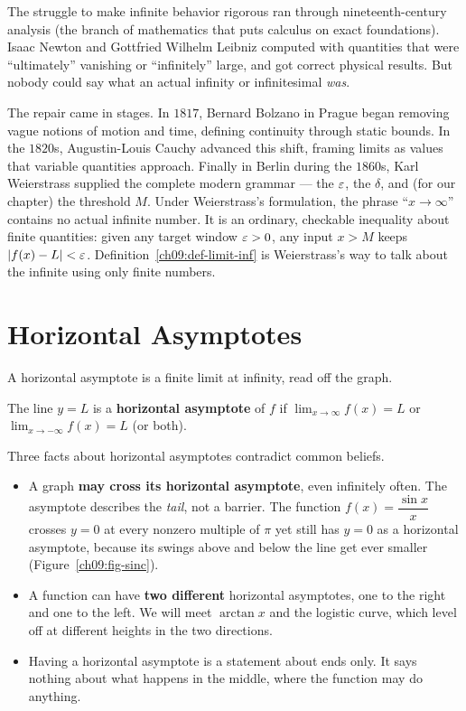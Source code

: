 \begin{historybox}
The struggle to make infinite behavior rigorous ran through
nineteenth-century analysis (the branch of mathematics that puts calculus on
exact foundations). Isaac Newton and Gottfried Wilhelm Leibniz computed
with quantities that were ``ultimately'' vanishing or ``infinitely'' large,
and got correct physical results. But
nobody could say what an actual infinity or infinitesimal \emph{was}.

The repair came in stages. In $1817$, Bernard Bolzano in Prague began removing
vague notions of motion and time, defining continuity through static bounds. In
the $1820$s, Augustin-Louis Cauchy advanced this shift, framing limits as values
that variable quantities approach. Finally in Berlin during the $1860$s, Karl
Weierstrass supplied the complete modern grammar --- the $\varepsilon$, the $\delta$,
and (for our chapter) the threshold $M$. Under Weierstrass's formulation, the
phrase ``$x\to\infty$'' contains no actual infinite number. It is an ordinary,
checkable inequality about finite quantities: given any target window $\varepsilon > 0$,
any input $x > M$ keeps $\lvert f(x)-L\rvert < \varepsilon$. Definition~\ref{ch09:def-limit-inf}
is Weierstrass's way to talk about the infinite using only finite numbers.
\end{historybox}

\section{Horizontal Asymptotes}
\label{ch09:horizontal}

A horizontal asymptote is a finite limit at infinity, read off the graph.

\begin{definition}
\label{ch09:def-ha}
The line $y=L$ is a \textbf{horizontal asymptote} of $f$ if
$\lim_{x\to\infty} f(x) = L$ or $\lim_{x\to-\infty} f(x) = L$ (or both).
\end{definition}

Three facts about horizontal asymptotes contradict common beliefs.

\begin{itemize}
\item A graph \textbf{may cross its horizontal asymptote}, even infinitely
often. The asymptote describes the \emph{tail}, not a barrier. The function
$f(x) = \dfrac{\sin x}{x}$ crosses $y=0$ at every nonzero multiple of $\pi$ yet still
has $y=0$ as a horizontal asymptote, because its swings above and below the
line get ever smaller (Figure~\ref{ch09:fig-sinc}).
\item A function can have \textbf{two different} horizontal asymptotes, one to
the right and one to the left. We will meet $\arctan x$ and the logistic curve,
which level off at different heights in the two directions.
\item Having a horizontal asymptote is a statement about ends only. It says
nothing about what happens in the middle, where the function may do anything.
\end{itemize}

